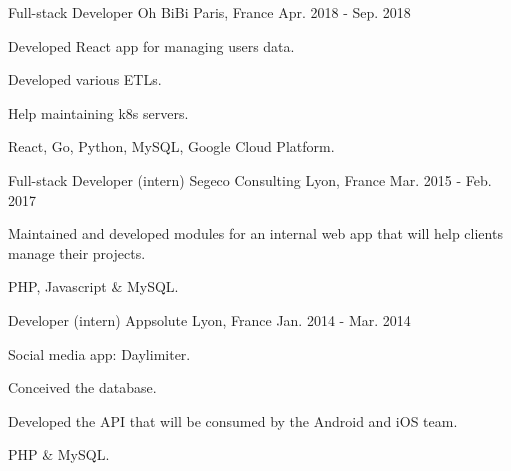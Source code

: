 

\begin{cventries}

  \cventry
  {Full-stack Developer} %
  {Oh BiBi} %
  {Paris, France} %
  {Apr. 2018 - Sep. 2018} %
    {
      \begin{cvitems} %
      \item {Developed React app for managing users data.}
      \item {Developed various ETLs.}
      \item {Help maintaining k8s servers.}
      \item {React, Go, Python, MySQL, Google Cloud Platform.}
      \end{cvitems}
    }

  \cventry
  {Full-stack Developer (intern)} %
  {Segeco Consulting} %
  {Lyon, France} %
  {Mar. 2015 - Feb. 2017} %
    {
      \begin{cvitems} %
      \item {Maintained and developed modules for an internal web app that will help clients manage their projects.}
      \item {PHP, Javascript \& MySQL.}
      \end{cvitems}
    }

  \cventry
  {Developer (intern)} %
  {Appsolute} %
  {Lyon, France} %
  {Jan. 2014 - Mar. 2014} %
    {
      \begin{cvitems} %
      \item {Social media app: Daylimiter.}
      \item {Conceived the database.}
      \item {Developed the API that will be consumed by the Android and iOS team.}
      \item {PHP \& MySQL.}
      \end{cvitems}
    }


\end{cventries}
